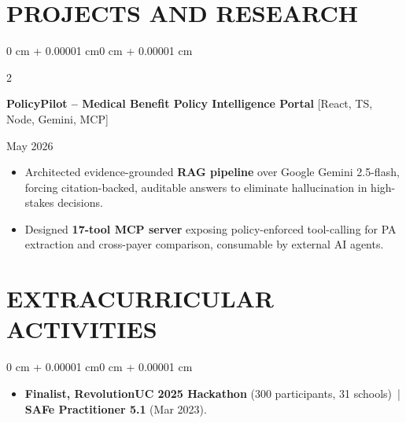 \documentclass[10pt, letterpaper]{article}
\newenvironment{highlights}{
    \begin{itemize}[
        topsep=0.10 cm,
        parsep=0.06 cm,
        partopsep=0pt,
        itemsep=0.06 cm,
        leftmargin=12pt
    ]
}{
    \end{itemize}
}
\newenvironment{onecolentry}{
    \begin{adjustwidth}{0 cm + 0.00001 cm}{0 cm + 0.00001 cm}
}{
    \end{adjustwidth}
}
\newenvironment{twocolentry}[2][]{
    \onecolentry
    \def\secondColumn{#2}
    \setcolumnwidth{\fill, 4.5 cm}
    \begin{paracol}{2}
}{
    \switchcolumn \raggedleft \secondColumn
    \end{paracol}
    \endonecolentry
}
\begin{document}
\section{PROJECTS AND RESEARCH}
\begin{twocolentry}{May 2026}
\textbf{PolicyPilot -- Medical Benefit Policy Intelligence Portal} [React, TS, Node, Gemini, MCP]
\end{twocolentry}
\begin{highlights}
  \item Architected evidence-grounded \textbf{RAG pipeline} over Google Gemini 2.5-flash, forcing citation-backed, auditable answers to eliminate hallucination in high-stakes decisions.
  \item Designed \textbf{17-tool MCP server} exposing policy-enforced tool-calling for PA extraction and cross-payer comparison, consumable by external AI agents.
\end{highlights}

\section{EXTRACURRICULAR ACTIVITIES}
\begin{onecolentry}
\begin{highlights}
  \item \textbf{Finalist, RevolutionUC 2025 Hackathon} (300 participants, 31 schools) \,|\, \textbf{SAFe Practitioner 5.1} (Mar 2023).
\end{highlights}
\end{onecolentry}
\end{document}
